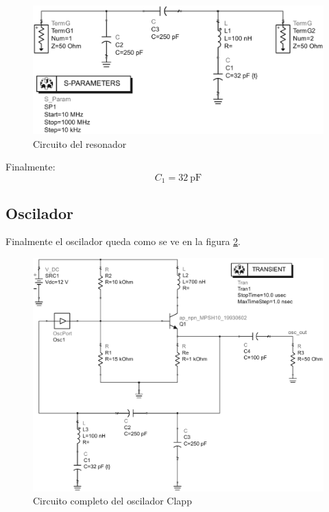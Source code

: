 \documentclass[journal]{IEEEtran}
\begin{document}
\begin{figure}[H]
\centering
\includegraphics[width=1\linewidth]{capturas/clapp_reso_sch-cropped.pdf}
\caption{Circuito del resonador}
\label{fig:clapp_reso_sch}
\end{figure}

Finalmente:
$$
\boxed{C_1 = \SI{32}{\pico\farad}}
$$

\subsection{Oscilador}

Finalmente el oscilador queda como se ve en la figura \ref{fig:clapp_osc_sch}.

\begin{figure}[H]
\centering
\includegraphics[width=1\linewidth]{capturas/clapp_osc_sch-cropped.pdf}
\caption{Circuito completo del oscilador Clapp}
\label{fig:clapp_osc_sch}
\end{figure}
\end{document}
